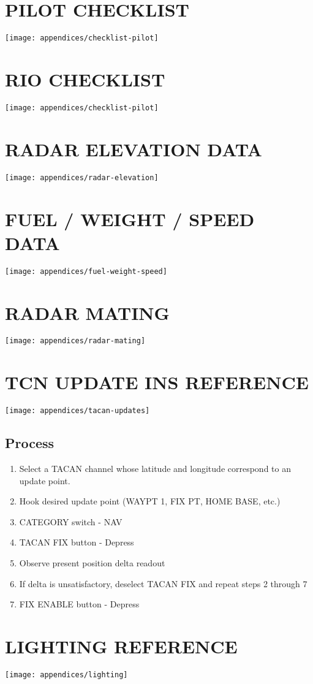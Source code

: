 
\section{PILOT CHECKLIST}

\texttt{[image: appendices/checklist-pilot]}

\section{RIO CHECKLIST}

\texttt{[image: appendices/checklist-pilot]}

\section{RADAR ELEVATION DATA}

\texttt{[image: appendices/radar-elevation]}

\section{FUEL / WEIGHT / SPEED DATA}

\texttt{[image: appendices/fuel-weight-speed]}

\section{RADAR MATING}
\label{sec:radar-mating}

\texttt{[image: appendices/radar-mating]}

\section{TCN UPDATE INS REFERENCE}

\texttt{[image: appendices/tacan-updates]}

\subsection*{Process}

\begin{enumerate}
  \item Select a TACAN channel whose latitude and longitude correspond to an
    update point.

  \item Hook desired update point (WAYPT 1, FIX PT, HOME BASE, etc.)

  \item CATEGORY switch - NAV

  \item TACAN FIX button - Depress

  \item Observe present position delta readout

  \item If delta is unsatisfactory, deselect TACAN FIX and repeat steps 2
    through 7

  \item FIX ENABLE button - Depress
\end{enumerate}

\section{LIGHTING REFERENCE}%
\label{sec:appendix-lights}

\texttt{[image: appendices/lighting]}
